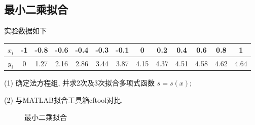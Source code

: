 \subsection{最小二乘拟合}
\begin{ex}
	实验数据如下
	
	\begin{tabular}{|c|c|c|c|c|c|c|c|c|c|c|c|c|}
		\hline$x_i$ & -1 & -0.8 & -0.6 & -0.4 & -0.3 & -0.1 & 0 & 0.2 & 0.4 & 0.6 & 0.8 & 1 \\
		\hline $y_i$ & 0 & 1.27 & 2.16 & 2.86 & 3.44 & 3.87 & 4.15 & 4.37 & 4.51 & 4.58 & 4.62 & 4.64 \\
		\hline
	\end{tabular}
	
	(1) 确定法方程组, 并求$ 2 $次及$ 3 $次拟合多项式函数 $s=s(x)$;
	
	(2) 与MATLAB拟合工具箱cftool对比.
\end{ex}

\begin{figure}[H]
	\centering
	\hfill
	\caption{最小二乘拟合}
\end{figure}